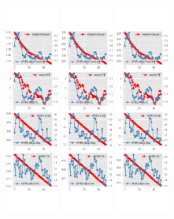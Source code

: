 \documentclass[]{article}
\begin{document}
\begin{figure}[ht]
\begin{subfigure}[b]{\textwidth}
		\includegraphics[width=0.19\textwidth]{figures/sce_ni_est_sv_diag2.png}
		\includegraphics[width=0.19\textwidth]{figures/sce_ni_est_sv_diag3.png}
		\includegraphics[width=0.19\textwidth]{figures/sce_ni_est_sv_diag4.png}

\end{subfigure}
\end{figure}
\end{document}
